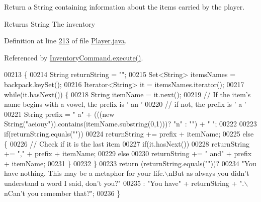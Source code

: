 Return a String containing information about the items carried by the player. 

\begin{DoxyReturn}{Returns}
String The inventory 
\end{DoxyReturn}


Definition at line \hyperlink{Player_8java_source_l00213}{213} of file \hyperlink{Player_8java_source}{Player.\-java}.



Referenced by \hyperlink{InventoryCommand_8java_source_l00019}{Inventory\-Command.\-execute()}.


\begin{DoxyCode}
00213                                  \{
00214         String returnString = \textcolor{stringliteral}{""};
00215         Set<String> itemsNames = backpack.keySet();
00216         Iterator<String> it = itemsNames.iterator();
00217         \textcolor{keywordflow}{while}(it.hasNext()) \{
00218             String itemName = it.next();
00219             \textcolor{comment}{// If the item's name begins with a vowel, the prefix is ' an '}
00220             \textcolor{comment}{// if not, the prefix is ' a '}
00221             String prefix = \textcolor{stringliteral}{" a"} + (((\textcolor{keyword}{new} String(\textcolor{stringliteral}{"aeiouy"})).contains(itemName.substring(0,1)))? \textcolor{stringliteral}{"n"} : \textcolor{stringliteral}{""}) +
       \textcolor{stringliteral}{" "};
00222 
00223             \textcolor{keywordflow}{if}(returnString.equals(\textcolor{stringliteral}{""}))
00224                 returnString += prefix + itemName;
00225             \textcolor{keywordflow}{else} \{
00226                 \textcolor{comment}{// Check if it is the last item}
00227                 \textcolor{keywordflow}{if}(it.hasNext())
00228                     returnString += \textcolor{stringliteral}{","} + prefix + itemName;
00229                 \textcolor{keywordflow}{else}
00230                     returnString += \textcolor{stringliteral}{" and"} + prefix + itemName;
00231             \}
00232         \}
00233         \textcolor{keywordflow}{return} (returnString.equals(\textcolor{stringliteral}{""}))?
00234             \textcolor{stringliteral}{"You have nothing. This may be a metaphor for your life.\(\backslash\)nBut as always you didn't understand a
       word I said, don't you?"}
00235             : \textcolor{stringliteral}{"You have"} + returnString + \textcolor{stringliteral}{".\(\backslash\)nCan't you remember that?"};
00236     \}
\end{DoxyCode}


